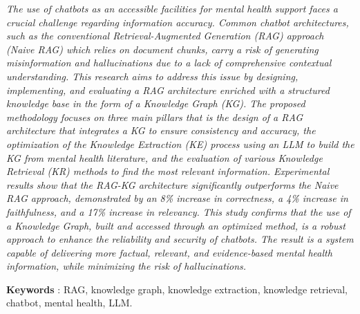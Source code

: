 \textit{
	The use of chatbots as an accessible facilities for mental health support faces a crucial challenge regarding information accuracy.
	Common chatbot architectures, such as the conventional Retrieval-Augmented Generation (RAG) approach (Naive RAG) which relies on document chunks, carry a risk of generating misinformation and hallucinations due to a lack of comprehensive contextual understanding.
	This research aims to address this issue by designing, implementing, and evaluating a RAG architecture enriched with a structured knowledge base in the form of a Knowledge Graph (KG).
	The proposed methodology focuses on three main pillars that is the design of a RAG architecture that integrates a KG to ensure consistency and accuracy, the optimization of the Knowledge Extraction (KE) process using an LLM to build the KG from mental health literature, and the evaluation of various Knowledge Retrieval (KR) methods to find the most relevant information.
	Experimental results show that the RAG-KG architecture significantly outperforms the Naive RAG approach, demonstrated by an 8\% increase in correctness, a 4\% increase in faithfulness, and a 17\% increase in relevancy.
	This study confirms that the use of a Knowledge Graph, built and accessed through an optimized method, is a robust approach to enhance the reliability and security of chatbots.
	The result is a system capable of delivering more factual, relevant, and evidence-based mental health information, while minimizing the risk of hallucinations.
}

\noindent\textbf{Keywords} : RAG, knowledge graph, knowledge extraction, knowledge retrieval, chatbot, mental health, LLM.